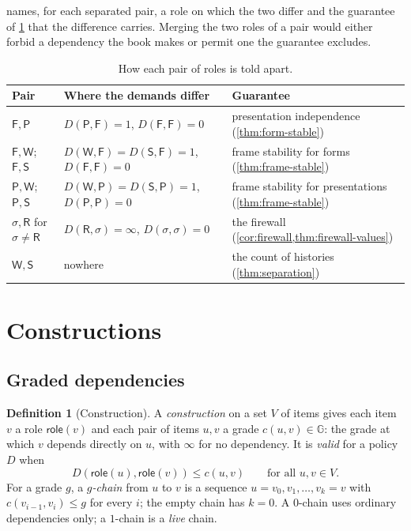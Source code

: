 \documentclass[11pt]{article}
\numberwithin{equation}{section}
\theoremstyle{definition}
\newtheorem{definition}{Definition}[section]
\theoremstyle{plain}
\theoremstyle{remark}
\newcommand{\Frm}{\mathsf F}
\newcommand{\Prs}{\mathsf P}
\newcommand{\Wit}{\mathsf W}
\newcommand{\Scr}{\mathsf S}
\newcommand{\Ren}{\mathsf R}
\newcommand{\Gd}{\mathbb G}
\newcommand{\role}{\mathsf{role}}
\newcommand{\absent}{\boldsymbol\infty}
\begin{document}
 names, for each separated pair, a role on which the two
differ and the guarantee of \cref{sec:constructions} that the difference
carries.  Merging the two roles of a pair would either forbid a dependency
the book makes or permit one the guarantee excludes.

\begin{table}[ht]
\centering
\small
\begin{tabularx}{\textwidth}{@{}l>{\raggedright\arraybackslash}p{}X@{}}
\toprule
Pair & Where the demands differ & Guarantee\\
\midrule
\(\Frm,\Prs\) & \(D(\Prs,\Frm)=1\), \(D(\Frm,\Frm)=0\) & presentation
independence (\cref{thm:form-stable})\\
\(\Frm,\Wit\);\ \(\Frm,\Scr\) & \(D(\Wit,\Frm)=D(\Scr,\Frm)=1\),
\(D(\Frm,\Frm)=0\) & frame stability for forms (\cref{thm:frame-stable})\\
\(\Prs,\Wit\);\ \(\Prs,\Scr\) & \(D(\Wit,\Prs)=D(\Scr,\Prs)=1\),
\(D(\Prs,\Prs)=0\) & frame stability for presentations
(\cref{thm:frame-stable})\\
\(\sigma,\Ren\) for \(\sigma\ne\Ren\) & \(D(\Ren,\sigma)=\absent\),
\(D(\sigma,\sigma)=0\) & the firewall (\cref{cor:firewall,thm:firewall-values})\\
\(\Wit,\Scr\) & nowhere & the count of histories (\cref{thm:separation})\\
\bottomrule
\end{tabularx}
\caption{How each pair of roles is told apart.}
\label{tab:separation}
\end{table}

\section{Constructions}\label{sec:constructions}

\subsection{Graded dependencies}

\begin{definition}[Construction]\label{def:construction}
A \emph{construction} on a set \(V\) of items gives each item \(v\) a role
\(\role(v)\) and each pair of items \(u,v\) a grade \(c(u,v)\in\Gd\): the
grade at which \(v\) depends directly on \(u\), with \(\absent\) for no
dependency.  It is \emph{valid} for a policy \(D\) when
\[
  D(\role(u),\role(v))\le c(u,v)\qquad\text{for all }u,v\in V.
\]
For a grade \(g\), a \emph{\(g\)-chain} from \(u\) to \(v\) is a sequence
\(u=v_0,v_1,\ldots,v_k=v\) with \(c(v_{i-1},v_i)\le g\) for every \(i\); the
empty chain has \(k=0\).  A \(0\)-chain uses ordinary dependencies only; a
\(1\)-chain is a \emph{live} chain.
\end{definition}
\end{document}
